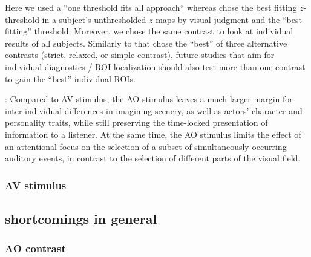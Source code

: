 \documentclass[english]{article}
\begin{document}
Here we used a ``one threshold fits all approach`` whereas
\citep{sengupta2016extension} chose the best fitting $z$-threshold in a
subject's unthresholded $z$-maps by visual judgment and the ``best fitting''
threshold.
Moreover, we chose the same contrast to look at individual results of all
subjects.
Similarly to \citep{sengupta2016extension} that chose the ``best'' of three
alternative contrasts (strict, relaxed, or simple contrast), future studies that
aim for individual diagnostics / ROI localization should also test more than one
contrast to gain the ``best'' individual ROIs.

\citep{hanke2014audiomovie}: Compared to AV stimulus, the AO stimulus leaves a
much larger margin for inter-individual differences in imagining scenery, as
well as actors' character and personality traits, while still preserving the
time-locked presentation of information to a listener. At the same time, the AO
stimulus limits the effect of an attentional focus on the selection of a subset
of simultaneously occurring auditory events, in contrast to the selection of
different parts of the visual field.




\subsubsection{AV stimulus}


\subsection{shortcomings in general}


\subsubsection{AO contrast}
\end{document}
